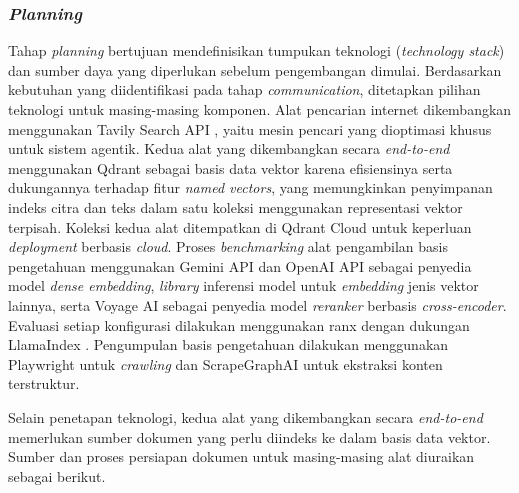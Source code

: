 \subsubsection{\textit{Planning}}
Tahap \textit{planning} bertujuan mendefinisikan tumpukan teknologi (\textit{technology stack}) dan sumber daya yang diperlukan sebelum pengembangan dimulai. Berdasarkan kebutuhan yang diidentifikasi pada tahap \textit{communication}, ditetapkan pilihan teknologi untuk masing-masing komponen. Alat pencarian internet dikembangkan menggunakan Tavily Search API \parencite{tavilyaiTavilyaiTavilypython2026}, yaitu mesin pencari yang dioptimasi khusus untuk sistem agentik. Kedua alat yang dikembangkan secara \textit{end-to-end} menggunakan Qdrant sebagai basis data vektor karena efisiensinya serta dukungannya terhadap fitur \textit{named vectors}, yang memungkinkan penyimpanan indeks citra dan teks dalam satu koleksi menggunakan representasi vektor terpisah. Koleksi kedua alat ditempatkan di Qdrant Cloud untuk keperluan \textit{deployment} berbasis \textit{cloud}. Proses \textit{benchmarking} alat pengambilan basis pengetahuan menggunakan Gemini API \parencite{google2025geminiapi} dan OpenAI API \parencite{openai2025api} sebagai penyedia model \textit{dense embedding}, \textit{library} inferensi model untuk \textit{embedding} jenis vektor lainnya, serta Voyage AI \parencite{voyageai2025rerankapi} sebagai penyedia model \textit{reranker} berbasis \textit{cross-encoder}. Evaluasi setiap konfigurasi dilakukan menggunakan ranx \parencite{bassaniRanxBlazingFastPython2022} dengan dukungan LlamaIndex \parencite{runllamaLlamaIndex2025}. Pengumpulan basis pengetahuan dilakukan menggunakan Playwright \parencite{playwright2020} untuk \textit{crawling} dan ScrapeGraphAI \parencite{scrapegraphai2024} untuk ekstraksi konten terstruktur.

Selain penetapan teknologi, kedua alat yang dikembangkan secara \textit{end-to-end} memerlukan sumber dokumen yang perlu diindeks ke dalam basis data vektor. Sumber dan proses persiapan dokumen untuk masing-masing alat diuraikan sebagai berikut.

